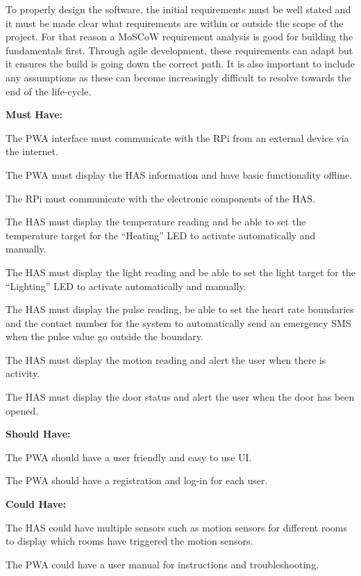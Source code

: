 \documentclass[final]{cmpreport}
\begin{document}
        To properly design the software, the initial requirements must be well stated and it must be made clear what requirements are within or outside the scope of the project. For that reason a MoSCoW requirement analysis is good for building the fundamentals first. Through agile development, these requirements can adapt but it ensures the build is going down the correct path. It is also important to include any assumptions as these can become increasingly difficult to resolve towards the end of the life-cycle. 
        
        \textbf{Must Have:}
        
        The PWA interface must communicate with the RPi from an external device via the internet.
        
        The PWA must display the HAS information and have basic functionality offline.
        
        The RPi must communicate with the electronic components of the HAS.
        
        The HAS must display the temperature reading and be able to set the temperature target for the ``Heating'' LED to activate automatically and manually.
        
        The HAS must display the light reading and be able to set the light target for the ``Lighting'' LED to activate automatically and manually.
        
        The HAS must display the pulse reading, be able to set the heart rate boundaries and the contact number for the system to automatically send an emergency SMS when the pulse value go outside the boundary.
        
        The HAS must display the motion reading and alert the user when there is activity.
        
        The HAS must display the door status and alert the user when the door has been opened.
        
        \textbf{Should Have:}
        
        The PWA should have a user friendly and easy to use UI.
        
        The PWA should have a registration and log-in for each user.
        
        \textbf{Could Have:}
        
        The HAS could have multiple sensors such as motion sensors for different rooms to display which rooms have triggered the motion sensors.
        
        The PWA could have a user manual for instructions and troubleshooting.
        
\end{document}
